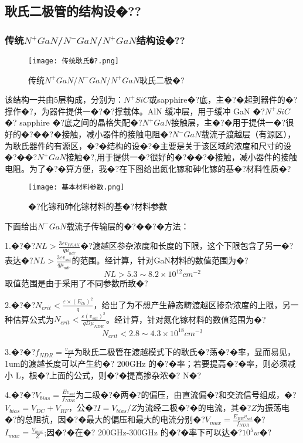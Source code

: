 \documentclass{zjureport}
\begin{document}
\subsection{耿氏二极管的结构设�??}
\subsubsection{传统$N^{+}GaN$/$N^{-}GaN$/$N^{+}GaN$结构设�??}
\begin{figure}[htbp]
	\centering
	\texttt{[image: 传统耿氏�?.png]}
	\caption{传统$N^{+}GaN$/$N^{-}GaN$/$N^{+}GaN$耿氏二极�?}
\end{figure}
该结构一共由5层构成，分别为：$N^{+}SiC$或sapphire�?底，主�?�起到器件的�?撑作�?，为器件提供一�?�?撑载体。AlN 缓冲层，用于缓冲 GaN �?$N^{+}SiC$�? sapphire �?底之间的晶格失配�?$N^{+}GaN$接触层，主�?�用于提供一�?很好的�?��?�接触，减小器件的接触电阻�?$N^{-}GaN$载流子渡越层（有源区），为耿氏器件的有源区，�?�结构的设�?�主要是关于该区域的浓度和尺寸的设�?��?$N^{+}GaN$接触�?,用于提供一�?很好的�?��?�接触，减小器件的接触电阻。为了�?�算方便，我�?在下图给出氮化镓和砷化镓的基�?材料性质�?
\begin{figure}[htbp]
	\centering
	\texttt{[image: 基本材料参数.png]}
	\caption{�?化镓和砷化镓材料的基�?材料参数}
\end{figure}

下面给出$N^{-}GaN$载流子传输层的�?��?�方法：

1.�?�?$NL>\frac{3\varepsilon	v_{PEAK}}{q\mu_{ndr}}$�?渡越区参杂浓度和长度的下限，这个下限包含了另一�?表达�?$NL>\frac{3\varepsilon v_{sat}}{q\mu_{ndr}}$的范围。经计算，针对GaN材料的数值范围为�?
\begin{equation}
	NL>5.3\sim8.2×10^{12}cm^{-2}
\end{equation}
取值范围是由于采用了不同参数所致�?

2.�?�?$N_{crit}<\frac{\varepsilon ×(E_{th})^{2}}{q}$，给出了为不想产生静态畴渡越区掺杂浓度的上限，另一种估算公式为$N_{crit}<\frac{\varepsilon (v_{sat})^{2}}{qD\mu_{NDR}}$。经计算，针对氮化镓材料的数值范围为�?
\begin{equation}
	N_{crit}<2.8\sim4.3×10^{18}cm^{-3}
\end{equation}

3.�?�?$f_{NDR}=\frac{v_{sat}}{L}$为耿氏二极管在渡越模式下的耿氏�?荡�?�率，显而易见，1um的渡越长度可以产生约�? 200GHz 的�?�率；若要提高�?�率，则必须减小 L，根�?上面的公式，则�?�提高掺杂浓�? N�?

4.�?�?$V_{bias}=\frac{Ev_{sat}}{f_{NDR}}$为二级�?�两�?的偏压，由直流偏�?和交流信号组成，�?$V_{bias}=V_{DC}+V_{RF}$，公�?$I=V_{bias}/Z$为流经二极�?�的电流，其�?$Z$为振荡电�?的总阻抗，因�?�最大的偏压和最大的电流分别�?$V_{max}=\frac{E_{BR}v_{sat}}{f_{NDR}}$�?$I_{max}=\frac{V_{max}}{Z}$;因�?�在�? 200GHz-300GHz 的�?�率下可以达�?$10^5w$�?
\end{document}
